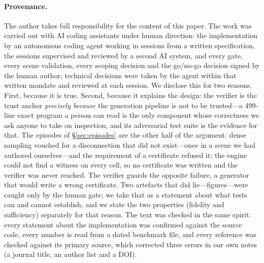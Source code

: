 \documentclass[10pt,twocolumn,letterpaper]{article}
\begin{document}
\paragraph{Provenance.} The author takes full responsibility for the content of this paper. The work was carried out with AI coding assistants under human direction: the implementation by an autonomous coding agent working in sessions from a written specification, the sessions supervised and reviewed by a second AI system, and every gate, every scene validation, every scoping decision and the go/no-go decision signed by the human author; technical decisions were taken by the agent within that written mandate and reviewed at each session. We disclose this for two reasons. First, because it is true. Second, because it explains the design: the verifier is the trust anchor \emph{precisely because} the generation pipeline is not to be trusted---a 499-line exact program a person can read is the only component whose correctness we ask anyone to take on inspection, and its adversarial test suite is the evidence for that. The episodes of \S\ref{sec:episodes} are the other half of the argument: dense sampling vouched for a disconnection that did not exist---once in a scene we had authored ourselves---and the requirement of a certificate refused it: the engine could not find a witness on every cell, so no certificate was written and the verifier was never reached. The verifier guards the opposite failure, a generator that would write a wrong certificate. Two artefacts that did lie---figures---were caught only by the human gate; we take that as a statement about what tests can and cannot establish, and we state the two properties (fidelity and sufficiency) separately for that reason. The text was checked in the same spirit: every statement about the implementation was confirmed against the source code, every number is read from a dated benchmark file, and every reference was checked against its primary source, which corrected three errors in our own notes (a journal title, an author list and a DOI).
\end{document}
